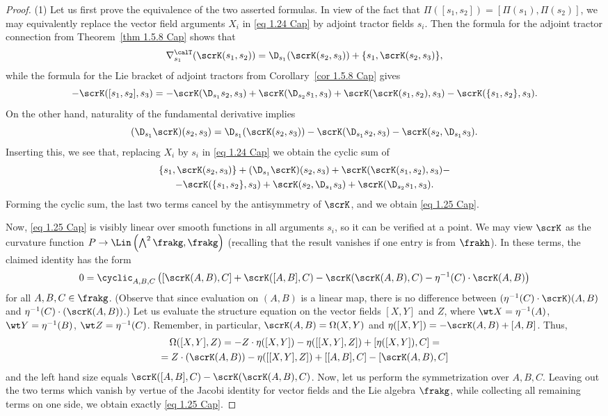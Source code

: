 \begin{proof}
    (1) Let us first prove the equivalence of the two asserted formulas. In view of the fact that $\varPi([s_1,s_2])=[\varPi(s_1),\varPi(s_2)]$, we may equivalently replace the vector field arguments $X_i$ in \eqref{eq 1.24 Cap} by adjoint tractor fields $s_i$. Then the formula for the adjoint tractor connection from Theorem~\ref{thm 1.5.8 Cap} shows that 
    \[\nabla^\calT_{s_1}(\scrK(s_1,s_2))=\D_{s_1}(\scrK(s_2,s_3))+\{s_1,\scrK(s_2,s_3)\},\]
    while the formula for the Lie bracket of adjoint tractors from Corollary~\ref{cor 1.5.8 Cap} gives 
    \[-\scrK([s_1,s_2],s_3)=-\scrK(\D_{s_1}s_2,s_3)+\scrK(\D_{s_2}s_1,s_3)+\scrK(\scrK(s_1,s_2),s_3)-\scrK(\{s_1,s_2\},s_3).\]
    On the other hand, naturality of the fundamental derivative implies 
    \[(\D_{s_1}\scrK)(s_2,s_3)=\D_{s_1}(\scrK(s_2,s_3))-\scrK(\D_{s_1}s_2,s_3)-\scrK(s_2,\D_{s_1}s_3).\]
    Inserting this, we see that, replacing $X_i$ by $s_i$ in \eqref{eq 1.24 Cap} we obtain the cyclic sum of 
    \begin{multline}
        \{s_1,\scrK(s_2,s_3)\}+(\D_{s_1}\scrK)(s_2,s_3)+\scrK(\scrK(s_1,s_2),s_3)-\\
        -\scrK(\{s_1,s_2\},s_3)+\scrK(s_2,\D_{s_1}s_3)+\scrK(\D_{s_2}s_1,s_3).
    \end{multline}
    Forming the cyclic sum, the last two terms cancel by the antisymmetry of $\scrK$, and we obtain \eqref{eq 1.25 Cap}.

    Now, \eqref{eq 1.25 Cap} is visibly linear over smooth functions in all arguments $s_i$, so it can be verified at a point. We may view $\scrK$ as the curvature function $P\to \Lin\left(\bigwedge\nolimits^2 \frakg,\frakg\right)$ (recalling that the result vanishes if one entry is from $\frakh$). In these terms, the claimed identity has the form 
    \[0=\cyclic_{A,B,C}\left(\left[\scrK(A,B),C\right]+\scrK([A,B],C)-\scrK(\scrK(A,B),C)-\eta^{-1}(C)\cdot \scrK(A,B)\right)\]
    for all $A,B,C\in\frakg$. (Observe that since evaluation on $(A,B)$ is a linear map, there is no difference between $(\eta^{-1}(C)\cdot\scrK)(A,B)$ and $\eta^{-1}(C)\cdot (\scrK(A,B))$.) Let us evaluate the structure equation on the vector fields $[X,Y]$ and $Z$, where $\wt X=\eta^{-1}(A)$, $\wt Y=\eta^{-1}(B)$, $\wt Z=\eta^{-1}(C)$. Remember, in particular, $\scrK(A,B)=\Omega(X,Y)$ and $\eta([X,Y])=-\scrK(A,B)+[A,B]$. Thus, 
    \begin{multline}
        \Omega([X,Y],Z)=-Z\cdot \eta([X,Y])-\eta([[X,Y],Z])+[\eta([X,Y]),C]=\\
        =Z\cdot (\scrK(A,B))-\eta([[X,Y],Z])+[[A,B],C]-[\scrK(A,B),C]
    \end{multline}
    and the left hand size equals $\scrK([A,B],C)-\scrK(\scrK(A,B),C)$. Now, let us perform the symmetrization over $A,B,C$. Leaving out the two terms which vanish by vertue of the Jacobi identity for vector fields and the Lie algebra $\frakg$, while collecting all remaining terms on one side, we obtain exactly \eqref{eq 1.25 Cap}.


\end{proof}
